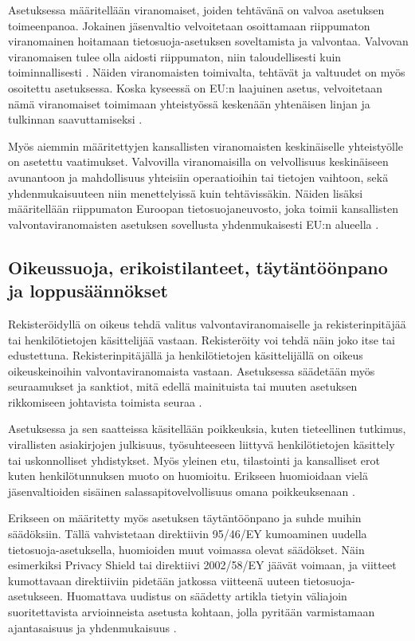 \documentclass[finnish]{tktltiki}
\begin{document}
Asetuksessa määritellään viranomaiset, joiden tehtävänä on valvoa asetuksen toimeenpanoa. Jokainen jäsenvaltio velvoitetaan osoittamaan riippumaton viranomainen hoitamaan tietosuoja-asetuksen soveltamista ja valvontaa. Valvovan viranomaisen tulee olla aidosti riippumaton, niin taloudellisesti kuin toiminnallisesti \cite{eu2016}. Näiden viranomaisten toimivalta, tehtävät ja valtuudet on myös osoitettu asetuksessa. Koska kyseessä on EU:n laajuinen asetus, velvoitetaan nämä viranomaiset toimimaan yhteistyössä keskenään yhtenäisen linjan ja tulkinnan saavuttamiseksi \cite{eu2016}.

Myös aiemmin määritettyjen kansallisten viranomaisten keskinäiselle yhteistyölle on asetettu vaatimukset. Valvovilla viranomaisilla on velvollisuus keskinäiseen avunantoon ja mahdollisuus yhteisiin operaatioihin tai tietojen vaihtoon, sekä yhdenmukaisuuteen niin menettelyissä kuin tehtävissäkin. Näiden lisäksi määritellään riippumaton Euroopan tietosuojaneuvosto, joka toimii kansallisten valvontaviranomaisten asetuksen sovellusta yhdenmukaisesti EU:n alueella \cite{eu2016}.


\subsection{Oikeussuoja, erikoistilanteet, täytäntöönpano ja loppusäännökset}

Rekisteröidyllä on oikeus tehdä valitus valvontaviranomaiselle ja rekisterinpitäjää tai henkilötietojen käsittelijää vastaan. Rekisteröity voi tehdä näin joko itse tai edustettuna. Rekisterinpitäjällä ja henkilötietojen käsittelijällä on oikeus oikeuskeinoihin valvontaviranomaista vastaan. Asetuksessa säädetään myös seuraamukset ja sanktiot, mitä edellä mainituista tai muuten asetuksen rikkomiseen johtavista toimista seuraa \cite{eu2016}.

Asetuksessa ja sen saatteissa käsitellään poikkeuksia, kuten tieteellinen tutkimus, virallisten asiakirjojen julkisuus, työsuhteeseen liittyvä henkilötietojen käsittely tai uskonnolliset yhdistykset. Myös yleinen etu, tilastointi ja kansalliset erot kuten henkilötunnuksen muoto on huomioitu. Erikseen huomioidaan vielä jäsenvaltioiden sisäinen salassapitovelvollisuus omana poikkeuksenaan \cite{eu2016}.

Erikseen on määritetty myös asetuksen täytäntöönpano ja suhde muihin säädöksiin. Tällä vahvistetaan direktiivin 95/46/EY kumoaminen uudella tietosuoja-asetuksella, huomioiden muut voimassa olevat säädökset. Näin esimerkiksi Privacy Shield tai direktiivi 2002/58/EY jäävät voimaan, ja viitteet kumottavaan direktiiviin pidetään jatkossa viitteenä uuteen tietosuoja-asetukseen. Huomattava uudistus on säädetty artikla tietyin väliajoin suoritettavista arvioinneista asetusta kohtaan, jolla pyritään varmistamaan ajantasaisuus ja yhdenmukaisuus \cite{eu2016}.
\end{document}
